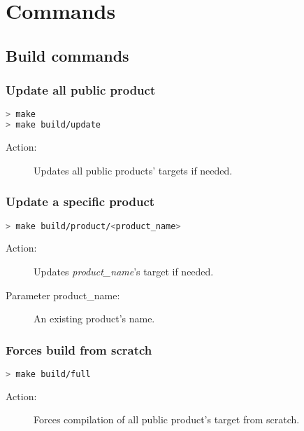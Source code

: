 \chapter{Commands}

\section{Build commands}

\subsection{Update all public product}

\begin{lstlisting}[language=bash]
> make
> make build/update
\end{lstlisting}

\begin{description}
    \item[Action:] Updates all public products' targets if needed.
\end{description}


\subsection{Update a specific product}

\begin{lstlisting}[language=bash]
> make build/product/<product_name>
\end{lstlisting}

\begin{description}
    \item[Action:] Updates \textit{product\_name}'s target if needed.
    \item[Parameter product\_name:] An existing product's name.
\end{description}


\subsection{Forces build from scratch}

\begin{lstlisting}[language=bash]
> make build/full
\end{lstlisting}

\begin{description}
    \item[Action:] Forces compilation of all public product's target from scratch.
\end{description}


